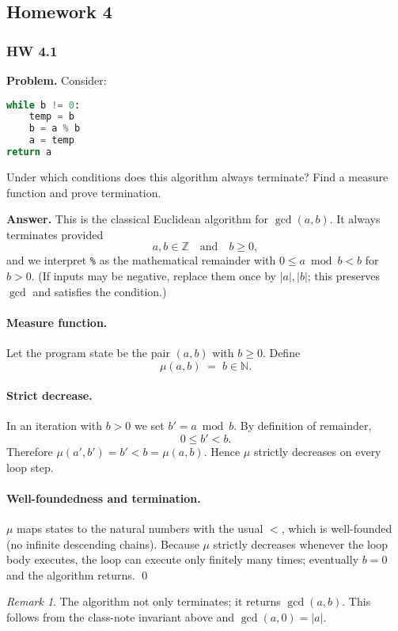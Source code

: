 \documentclass{article}
\theoremstyle{theorem}
\theoremstyle{definition}
\theoremstyle{remark}
\newtheorem{remark}[theorem]{Remark}
\begin{document}
\subsection{Homework 4}

\subsubsection*{HW 4.1}
\textbf{Problem.} Consider:
\begin{lstlisting}[language=Python]
while b != 0:
    temp = b
    b = a % b
    a = temp
return a
\end{lstlisting}
Under which conditions does this algorithm always terminate? Find a measure function and prove termination.

\medskip
\textbf{Answer.}  
This is the classical Euclidean algorithm for $\gcd(a,b)$. It always terminates provided
\[
a,b \in \mathbb{Z}\quad\text{and}\quad b \ge 0,
\]
and we interpret \texttt{\%} as the mathematical remainder with $0 \le a \bmod b < b$ for $b>0$. (If inputs may be negative, replace them once by $|a|,|b|$; this preserves $\gcd$ and satisfies the condition.)

\paragraph{Measure function.}
Let the program state be the pair $(a,b)$ with $b \ge 0$. Define
\[
\mu(a,b) \;=\; b \in \mathbb{N}.
\]

\paragraph{Strict decrease.}
In an iteration with $b>0$ we set $b' = a \bmod b$. By definition of remainder,
\[
0 \le b' < b.
\]
Therefore $\mu(a',b') = b' < b = \mu(a,b)$. Hence $\mu$ strictly decreases on every loop step.

\paragraph{Well-foundedness and termination.}
$\mu$ maps states to the natural numbers with the usual $<$, which is well-founded (no infinite descending chains). Because $\mu$ strictly decreases whenever the loop body executes, the loop can execute only finitely many times; eventually $b=0$ and the algorithm returns. \qed

\begin{remark}
The algorithm not only terminates; it returns $\gcd(a,b)$. This follows from the class-note invariant above and $\gcd(a,0)=|a|$.
\end{remark}
\end{document}
